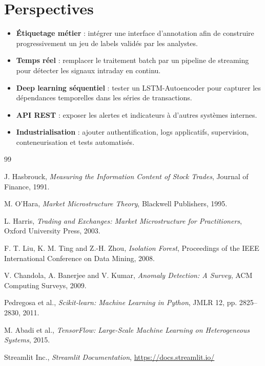 \documentclass[a4paper,12pt,twoside,openright]{report}
\begin{document}
\section{Perspectives}
\begin{itemize}
  \item \textbf{Étiquetage métier} : intégrer une interface d'annotation afin de construire progressivement un jeu de labels validés par les analystes.
  \item \textbf{Temps réel} : remplacer le traitement batch par un pipeline de streaming pour détecter les signaux intraday en continu.
  \item \textbf{Deep learning séquentiel} : tester un LSTM-Autoencoder pour capturer les dépendances temporelles dans les séries de transactions.
  \item \textbf{API REST} : exposer les alertes et indicateurs à d'autres systèmes internes.
  \item \textbf{Industrialisation} : ajouter authentification, logs applicatifs, supervision, conteneurisation et tests automatisés.
\end{itemize}

\cleardoublepage
{}
{}
\begin{thebibliography}{99}

J. Hasbrouck,
\textit{Measuring the Information Content of Stock Trades},
Journal of Finance, 1991.

M. O'Hara,
\textit{Market Microstructure Theory},
Blackwell Publishers, 1995.

L. Harris,
\textit{Trading and Exchanges: Market Microstructure for Practitioners},
Oxford University Press, 2003.

F. T. Liu, K. M. Ting and Z.-H. Zhou,
\textit{Isolation Forest},
Proceedings of the IEEE International Conference on Data Mining, 2008.

V. Chandola, A. Banerjee and V. Kumar,
\textit{Anomaly Detection: A Survey},
ACM Computing Surveys, 2009.

Pedregosa et al.,
\textit{Scikit-learn: Machine Learning in Python},
JMLR 12, pp. 2825--2830, 2011.

M. Abadi et al.,
\textit{TensorFlow: Large-Scale Machine Learning on Heterogeneous Systems}, 2015.

Streamlit Inc.,
\textit{Streamlit Documentation},
\url{https://docs.streamlit.io/}

\end{thebibliography}
\end{document}
